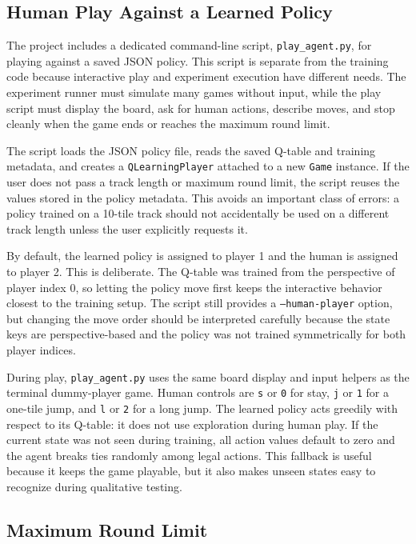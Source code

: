 \documentclass[conference]{IEEEtran}
\begin{document}
\subsection{Human Play Against a Learned Policy}

The project includes a dedicated command-line script, \texttt{play\_agent.py}, for
playing against a saved JSON policy. This script is separate from the training
code because interactive play and experiment execution have different needs. The
experiment runner must simulate many games without input, while the play script
must display the board, ask for human actions, describe moves, and stop cleanly
when the game ends or reaches the maximum round limit.

The script loads the JSON policy file, reads the saved Q-table and training
metadata, and creates a \texttt{QLearningPlayer} attached to a new \texttt{Game}
instance. If the user does not pass a track length or maximum round limit, the
script reuses the values stored in the policy metadata. This avoids an important
class of errors: a policy trained on a 10-tile track should not accidentally be
used on a different track length unless the user explicitly requests it.

By default, the learned policy is assigned to player 1 and the human is assigned
to player 2. This is deliberate. The Q-table was trained from the perspective of
player index 0, so letting the policy move first keeps the interactive behavior
closest to the training setup. The script still provides a \texttt{--human-player}
option, but changing the move order should be interpreted carefully because the
state keys are perspective-based and the policy was not trained symmetrically for
both player indices.

During play, \texttt{play\_agent.py} uses the same board display and input helpers
as the terminal dummy-player game. Human controls are \texttt{s} or \texttt{0} for
stay, \texttt{j} or \texttt{1} for a one-tile jump, and \texttt{l} or \texttt{2}
for a long jump. The learned policy acts greedily with respect to its Q-table: it
does not use exploration during human play. If the current state was not seen
during training, all action values default to zero and the agent breaks ties
randomly among legal actions. This fallback is useful because it keeps the game
playable, but it also makes unseen states easy to recognize during qualitative
testing.

\subsection{Maximum Round Limit}
\end{document}

